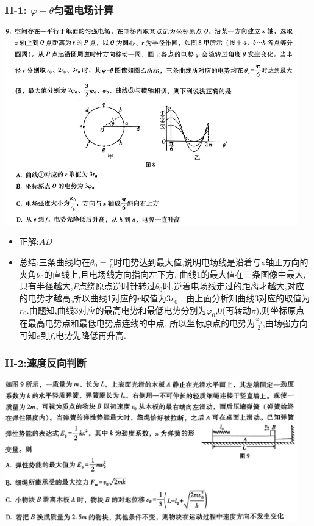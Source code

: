 \documentclass{article}
\begin{document}
\subsubsection{II-1: \texorpdfstring{$\varphi - \theta$} 的匀强电场计算}
\includegraphics[width=0.95\textwidth,keepaspectratio]{./pictures/3.8-3.png}

\begin{itemize}
    \item 正解:\quad $AD$
    \item 总结:\quad 三条曲线均在$\theta_{0} = \frac{\pi}{6}$时电势达到最大值,说明电场线是沿着与x轴正方向的夹角$\theta_{0}$的直线上,且电场线方向指向左下方,
    曲线1的最大值在三条图像中最大,只有半径越大,$P$点绕原点逆时针转过$\theta_{0}$时,逆着电场线走过的距离才越大,对应的电势才越高,所以曲线1对应的$r$取值为$3r_{0}$ .
    由上面分析知曲线3对应的取值为$r_{0}$.由题知,曲线3对应的最高电势和最低电势分别为$\varphi_{0}$,$0$(再转动$\pi$),则坐标原点在最高电势点和最低电势点连线的中点,
    所以坐标原点的电势为$\frac{\varphi_{0}}{2}$,由场强方向可知$e$到$f$,电势先降低再升高. 
    
\end{itemize}


\vspace{2em}


\subsubsection{II-2:速度反向判断}
\includegraphics[width=0.95\textwidth,keepaspectratio]{./pictures/3.8-1.png}
\end{document}
